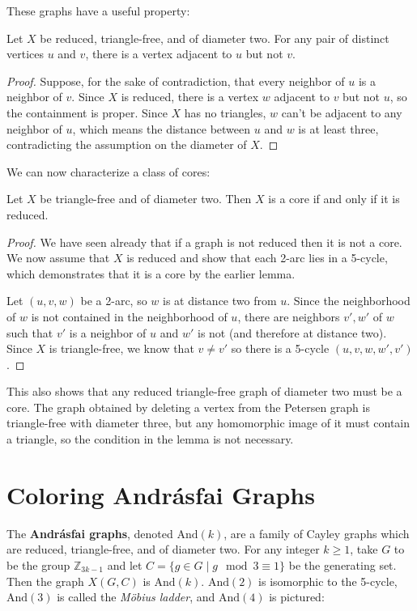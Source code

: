 These graphs have a useful property:

\begin{lemma}
	Let $X$ be reduced, triangle-free, and of diameter two.  For any pair of distinct vertices $u$ and $v$, there is a vertex adjacent to $u$ but not $v$.
\end{lemma}
\begin{proof}
	Suppose, for the sake of contradiction, that every neighbor of $u$ is a neighbor of $v$.  Since $X$ is reduced, there is a vertex $w$ adjacent to $v$ but not $u$, so the containment is proper.  Since $X$ has no triangles, $w$ can't be adjacent to any neighbor of $u$, which means the distance between $u$ and $w$ is at least three, contradicting the assumption on the diameter of $X$.
\end{proof}


We can now characterize a class of cores:

\begin{lemma}
	Let $X$ be triangle-free and of diameter two.  Then $X$ is a core if and only if it is reduced.
\end{lemma}
\begin{proof}
	We have seen already that if a graph is not reduced then it is not a core.  We now assume that $X$ is reduced and show that each 2-arc lies in a 5-cycle, which demonstrates that it is a core by the earlier lemma.
	
	Let $(u,v,w)$ be a 2-arc, so $w$ is at distance two from $u$.  Since the neighborhood of $w$ is not contained in the neighborhood of $u$, there are neighbors $v',w'$ of $w$ such that $v'$ is a neighbor of $u$ and $w'$ is not (and therefore at distance two).  Since $X$ is triangle-free, we know that $v\neq v'$ so there is a 5-cycle $(u,v,w,w',v')$.
\end{proof}

This also shows that any reduced triangle-free graph of diameter two must be a core.  The graph obtained by deleting a vertex from the Petersen graph is triangle-free with diameter three, but any homomorphic image of it must contain a triangle, so the condition in the lemma is not necessary.

\section*{Coloring Andr\'asfai Graphs}

The \textbf{Andr\'asfai graphs}, denoted $\mathrm{And}(k)$, are a family of Cayley graphs which are reduced, triangle-free, and of diameter two.  For any integer $k\geq 1$, take $G$ to be the group $\mathbb{Z}_{3k-1}$ and let $C=\{g\in G \mid g\mod 3 \equiv 1\}$ be the generating set.  Then the graph $X(G,C)$ is $\mathrm{And}(k)$.  $\mathrm{And}(2)$ is isomorphic to the 5-cycle, $\mathrm{And}(3)$ is called the \textit{M\"obius ladder}, and $\mathrm{And}(4)$ is pictured:

